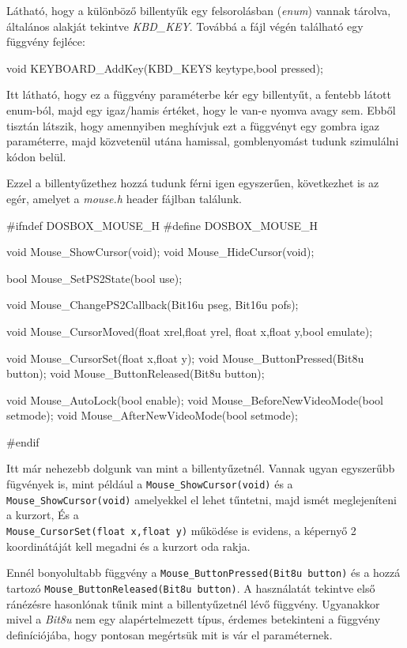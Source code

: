 Látható, hogy a különböző billentyűk egy felsorolásban (\textit{enum}) vannak tárolva, általános alakját tekintve \textit{KBD\_KEY}.
Továbbá a fájl végén található egy függvény fejléce:

\begin{cpp}
    void KEYBOARD_AddKey(KBD_KEYS keytype,bool pressed);
\end{cpp}

Itt látható, hogy ez a függvény paraméterbe kér egy billentyűt, a fentebb látott enum-ból, majd egy igaz/hamis értéket, hogy le van-e nyomva avagy sem. Ebből tisztán látszik, hogy amennyiben meghívjuk ezt a függvényt egy gombra igaz paraméterre, majd közvetenül utána hamissal, gomblenyomást tudunk szimulálni kódon belül. 

Ezzel a billentyűzethez hozzá tudunk férni igen egyszerűen, következhet is az egér, amelyet a \textit{mouse.h} header fájlban találunk.

\begin{cpp}

    #ifndef DOSBOX_MOUSE_H
    #define DOSBOX_MOUSE_H
    
    
    void Mouse_ShowCursor(void);
    void Mouse_HideCursor(void);
    
    bool Mouse_SetPS2State(bool use);
    
    void Mouse_ChangePS2Callback(Bit16u pseg, Bit16u pofs);
    
    void Mouse_CursorMoved(float xrel,float yrel,
                           float x,float y,bool emulate);

    void Mouse_CursorSet(float x,float y);
    void Mouse_ButtonPressed(Bit8u button);
    void Mouse_ButtonReleased(Bit8u button);
    
    void Mouse_AutoLock(bool enable);
    void Mouse_BeforeNewVideoMode(bool setmode);
    void Mouse_AfterNewVideoMode(bool setmode);
    
    #endif

\end{cpp}

Itt már nehezebb dolgunk van mint a billentyűzetnél. Vannak ugyan egyszerűbb fügvények is, mint például a \verb|Mouse_ShowCursor(void)| és a \verb|Mouse_ShowCursor(void)| amelyekkel el lehet tűntetni, majd ismét meglejeníteni a kurzort,
És a\\ \verb|Mouse_CursorSet(float x,float y)| működése is evidens, a képernyő 2 koordinátáját kell megadni és a kurzort oda rakja.

Ennél bonyolultabb függvény a \verb|Mouse_ButtonPressed(Bit8u button)| és a hozzá tartozó \verb|Mouse_ButtonReleased(Bit8u button)|. A használatát tekintve első ránézésre hasonlónak tűnik mint a billentyűzetnél lévő függvény. Ugyanakkor mivel a \textit{Bit8u} nem egy alapértelmezett típus, érdemes betekinteni a függvény definíciójába, hogy pontosan megértsük mit is vár el paraméternek.

